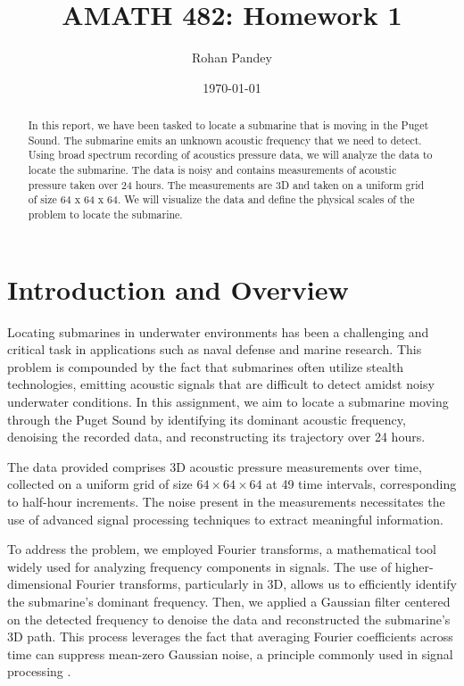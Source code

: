 \documentclass[11pt]{amsart}
\title{AMATH 482: Homework 1}
\author{Rohan Pandey} %
\date{\today} %
\begin{document}
\begin{abstract}
    In this report, we have been tasked to locate a submarine that is moving in the Puget Sound. The submarine emits an unknown acoustic frequency that we need to detect. Using broad spectrum recording of acoustics pressure data, we will analyze the data to locate the submarine. The data is noisy and contains measurements of acoustic pressure taken over 24 hours. The measurements are 3D and taken on a uniform grid of size 64 x 64 x 64. We will visualize the data and define the physical scales of the problem to locate the submarine.
\end{abstract}

\maketitle

\section{Introduction and Overview}\label{sec:Introduction}



Locating submarines in underwater environments has been a challenging and critical task in applications such as naval defense and marine research. This problem is compounded by the fact that submarines often utilize stealth technologies, emitting acoustic signals that are difficult to detect amidst noisy underwater conditions. In this assignment, we aim to locate a submarine moving through the Puget Sound by identifying its dominant acoustic frequency, denoising the recorded data, and reconstructing its trajectory over 24 hours.

The data provided comprises 3D acoustic pressure measurements over time, collected on a uniform grid of size $64 \times 64 \times 64$ at 49 time intervals, corresponding to half-hour increments. The noise present in the measurements necessitates the use of advanced signal processing techniques to extract meaningful information. 

To address the problem, we employed Fourier transforms, a mathematical tool widely used for analyzing frequency components in signals. The use of higher-dimensional Fourier transforms, particularly in 3D, allows us to efficiently identify the submarine's dominant frequency. Then, we applied a Gaussian filter centered on the detected frequency to denoise the data and reconstructed the submarine's 3D path. This process leverages the fact that averaging Fourier coefficients across time can suppress mean-zero Gaussian noise, a principle commonly used in signal processing \cite{oppenheim1999discrete}.
\end{document}
